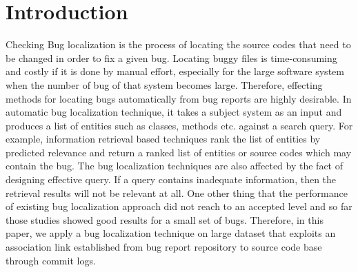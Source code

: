 \documentclass{sig-alternate}
\begin{document}

\section{Introduction}\label{sec:introduction}
Checking
Bug localization is the process of locating the source codes that need to be changed in order to fix a given bug. 
Locating buggy files is time-consuming and costly if it is done by manual effort, especially for the large software system when the number of bug of that system becomes large. Therefore, effecting methods for locating bugs automatically from bug reports are highly desirable. 
In automatic bug localization technique, it takes a subject system as an input and produces a list of entities such as classes, methods etc. against a search query. For example, information retrieval based techniques rank the list of entities by predicted relevance and return a ranked list of entities or source codes which may contain the bug. 
The bug localization techniques are also affected by the fact of designing effective query. If a query contains inadequate information, then the retrieval results will not be relevant at all. One other thing that the performance of existing bug localization approach did not reach to an accepted level and so far those studies showed good results for a small set of bugs. Therefore,
in this paper, we apply a bug localization technique on large dataset that exploits an association link established from bug report repository to source code base through commit logs. 
\end{document}

